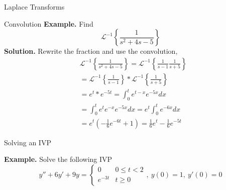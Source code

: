 \documentclass{article}
\newcommand{\ilaplace}[1]{\mathcal{L}^{-1}\left\{#1\right\}}
\begin{document}
\begin{multicols*}{3}
\begin{blackbox}{Laplace Transforms}
            \begin{redbox}{Convolution}
                \textbf{Example.} Find \\[-4ex]
                {\footnotesize
                \[\ilaplace{\frac{1}{s^2 + 4s - 5}}\]
                \textbf{Solution.} Rewrite the fraction and use the convolution, \\[-3ex]
                \begin{align*}
                    &\ilaplace{\frac{1}{s^2 + 4s - 5}} = \ilaplace{\frac{1}{s-1} \frac{1}{s+5}} \\
                    &= \ilaplace{\frac{1}{s-1}} * \ilaplace{\frac{1}{s+5}}\\
                    &= e^{t} * e^{-5t} = \int_0^t e^{t-x}e^{-5x}dx\\
                    &= \int_0^t e^{t}e^{-x}e^{-5x}dx = e^t \int_0^t e^{-6x}dx\\
                    &= e^t\left(-\frac{1}{6}e^{-6t} + 1\right) = \frac{1}{6}e^t - \frac{1}{6}e^{-5t}
                \end{align*}
                }
            \end{redbox}
            \begin{brownbox}{Solving an IVP}
                {\footnotesize
                \textbf{Example.} Solve the following IVP \\[-2ex]
                \[y'' + 6y' + 9y = \begin{cases}
                    0 & 0 \leq t < 2\\
                    e^{-3t} & t \geq 0
                \end{cases}, \ y(0) = 1, \ y'(0) = 0\]
                
}
\end{brownbox}
\end{blackbox}
\end{multicols*}
\end{document}
